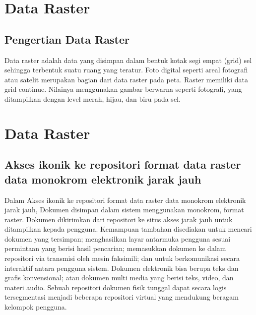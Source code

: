 
\section{Data Raster}
\subsection{Pengertian Data Raster}
Data raster adalah data yang disimpan dalam bentuk kotak segi empat (grid) sel sehingga terbentuk suatu ruang yang 
teratur. Foto digital seperti areal fotografi atau satelit merupakan bagian dari data raster pada peta. 
Raster memiliki data grid continue. Nilainya menggunakan gambar berwarna seperti fotografi, yang ditampilkan dengan 
level merah, hijau, dan biru pada sel. 
\section{Data Raster}
\subsection{Akses ikonik ke repositori format data raster data monokrom elektronik jarak jauh}
Dalam Akses ikonik ke repositori format data raster data monokrom elektronik jarak jauh, 
 Dokumen disimpan dalam sistem menggunakan monokrom, format raster. Dokumen dikirimkan dari repositori ke situs akses jarak jauh untuk ditampilkan kepada pengguna. Kemampuan tambahan disediakan untuk mencari dokumen yang tersimpan; menghasilkan layar antarmuka pengguna sesuai permintaan yang berisi hasil pencarian; memasukkan dokumen ke dalam repositori via transmisi oleh mesin faksimili; dan untuk berkomunikasi secara interaktif antara pengguna sistem. Dokumen elektronik bisa berupa teks dan grafis konvensional; atau dokumen multi media yang berisi teks, video, dan materi audio. Sebuah repositori dokumen fisik tunggal dapat secara logis tersegmentasi menjadi beberapa repositori virtual yang mendukung beragam kelompok pengguna.
